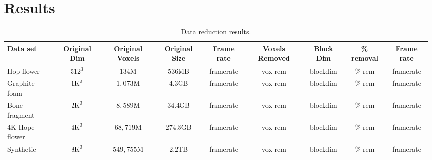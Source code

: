 \documentclass[journal]{vgtc}                %
\begin{document}
\section{Results}

\begin{table}[h]
	\caption{Data reduction results.}\label{table:dataReduction}
	\scriptsize
	
\begin{center}
	
	\begin{tabular}{lcccc|cccc}
		\textbf{Data set} & \textbf{Original Dim}& \textbf{Original Voxels} & \textbf{Original Size}& \textbf{Frame rate} & 
			\textbf{Voxels Removed} & \textbf{Block Dim} & \textbf{\% removal} & \textbf{Frame rate}\\
		
		\hline
		
		Hop flower      & $512^3$              &  $134$M     & $536$MB   & framerate & vox rem & blockdim & \% rem & framerate \\
		Graphite foam   & $1\textnormal{K}^3$  & $1,073$M    & $4.3$GB   & framerate & vox rem & blockdim & \% rem & framerate \\
		Bone fragment   & $2\textnormal{K}^3$  & $8,589$M    & $34.4$GB  & framerate & vox rem & blockdim & \% rem & framerate \\
		4K Hope flower  & $4\textnormal{K}^3$  & $68,719$M   & $274.8$GB & framerate & vox rem & blockdim & \% rem & framerate \\
		Synthetic       & $8\textnormal{K}^3$  & $549,755$M  & $2.2$TB   & framerate & vox rem & blockdim & \% rem & framerate \\
	\end{tabular}
	
	\end{center}
	
\end{table}
\end{document}
